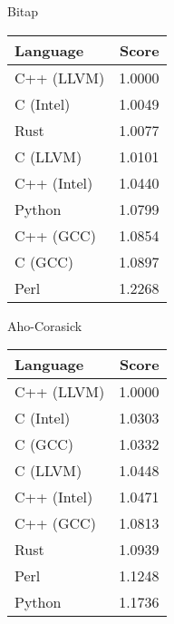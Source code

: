 \begin{subtable}{0.33\textwidth}
    \centering
    \caption{Bitap}
    \label{table:energy:shift_or}
    \begin{tabular}{|l|r|}
        \hline
        Language & Score \\
        \hline
        C++ (LLVM) & 1.0000 \\
        C (Intel) & 1.0049 \\
        Rust & 1.0077 \\
        C (LLVM) & 1.0101 \\
        C++ (Intel) & 1.0440 \\
        Python & 1.0799 \\
        C++ (GCC) & 1.0854 \\
        C (GCC) & 1.0897 \\
        Perl & 1.2268 \\
        \hline
    \end{tabular}
\end{subtable}
\begin{subtable}{0.33\textwidth}
    \centering
    \caption{Aho-Corasick}
    \label{table:energy:aho_corasick}
    \begin{tabular}{|l|r|}
        \hline
        Language & Score \\
        \hline
        C++ (LLVM) & 1.0000 \\
        C (Intel) & 1.0303 \\
        C (GCC) & 1.0332 \\
        C (LLVM) & 1.0448 \\
        C++ (Intel) & 1.0471 \\
        C++ (GCC) & 1.0813 \\
        Rust & 1.0939 \\
        Perl & 1.1248 \\
        Python & 1.1736 \\
        \hline
    \end{tabular}
\end{subtable}%
